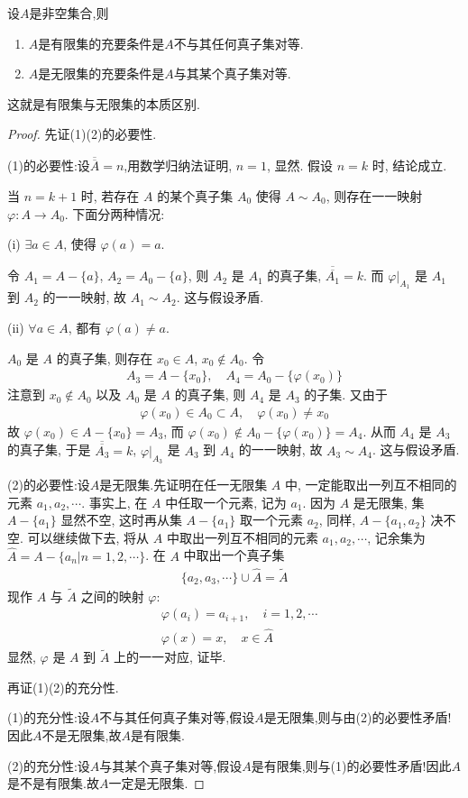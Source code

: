 \documentclass[../../main.tex]{subfiles}
\begin{document}
\begin{theorem}
设$A$是非空集合,则
\begin{enumerate}[(1)]
\item $A$是有限集的充要条件是$A$不与其任何真子集对等.
\item $A$是无限集的充要条件是$A$与其某个真子集对等.
\end{enumerate}
\end{theorem}
\begin{note}
这就是有限集与无限集的本质区别.
\end{note}
\begin{proof}
先证(1)(2)的必要性.

(1)的必要性:设$\overline{\overline{A}} = n$,用数学归纳法证明, $n = 1$, 显然. 假设 $n = k$ 时, 结论成立.

当 $n = k + 1$ 时, 若存在 $A$ 的某个真子集 $A_0$ 使得 $A \sim A_0$, 则存在一一映射 $\varphi : A \to A_0$. 下面分两种情况:

(i) $\exists a \in A$, 使得 $\varphi(a) = a$.

令 $A_1 = A - \{a\}$, $A_2 = A_0 - \{a\}$, 则 $A_2$ 是 $A_1$ 的真子集, $\overline{\overline{A_1}} = k$. 而 $\varphi|_{A_1}$ 是 $A_1$ 到 $A_2$ 的一一映射, 故 $A_1 \sim A_2$. 这与假设矛盾.

(ii) $\forall a \in A$, 都有 $\varphi(a) \neq a$.

$A_0$ 是 $A$ 的真子集, 则存在 $x_0 \in A$, $x_0 \notin A_0$. 令
\begin{align*}
A_3 = A - \{x_0\}, \quad A_4 = A_0 - \{\varphi(x_0)\}
\end{align*}
注意到 $x_0 \notin A_0$ 以及 $A_0$ 是 $A$ 的真子集, 则 $A_4$ 是 $A_3$ 的子集. 又由于
\begin{align*}
\varphi(x_0) \in A_0 \subset A, \quad \varphi(x_0) \neq x_0
\end{align*}
故 $\varphi(x_0) \in A - \{x_0\} = A_3$, 而 $\varphi(x_0) \notin A_0 - \{\varphi(x_0)\} = A_4$. 从而 $A_4$ 是 $A_3$ 的真子集, 于是 $\overline{\overline{A_3}} = k$, $\varphi|_{A_3}$ 是 $A_3$ 到 $A_4$ 的一一映射, 故 $A_3 \sim A_4$. 这与假设矛盾. 

(2)的必要性:设$A$是无限集.先证明在任一无限集 $A$ 中, 一定能取出一列互不相同的元素 $a_1, a_2, \cdots$. 事实上, 在 $A$ 中任取一个元素, 记为 $a_1$. 因为 $A$ 是无限集, 集 $A - \{a_1\}$ 显然不空, 这时再从集 $A - \{a_1\}$ 取一个元素 $a_2$, 同样, $A - \{a_1, a_2\}$ 决不空. 可以继续做下去, 将从 $A$ 中取出一列互不相同的元素 $a_1, a_2, \cdots$, 记余集为 $\hat{A} = A - \{a_n | n = 1, 2, \cdots\}$. 在 $A$ 中取出一个真子集
\begin{align*}
\{a_2, a_3, \cdots\} \cup \hat{A} = \tilde{A}
\end{align*}
现作 $A$ 与 $\tilde{A}$ 之间的映射 $\varphi$:
\begin{align*}
&\varphi(a_i) = a_{i + 1}, \quad i = 1, 2, \cdots\\
&\varphi(x) = x, \quad x \in \hat{A}
\end{align*}
显然, $\varphi$ 是 $A$ 到 $\tilde{A}$ 上的一一对应, 证毕. 

再证(1)(2)的充分性.

(1)的充分性:设$A$不与其任何真子集对等,假设$A$是无限集,则与由(2)的必要性矛盾!因此$A$不是无限集,故$A$是有限集.

(2)的充分性:设$A$与其某个真子集对等,假设$A$是有限集,则与(1)的必要性矛盾!因此$A$是不是有限集.故$A$一定是无限集.
\end{proof}
\end{document}
